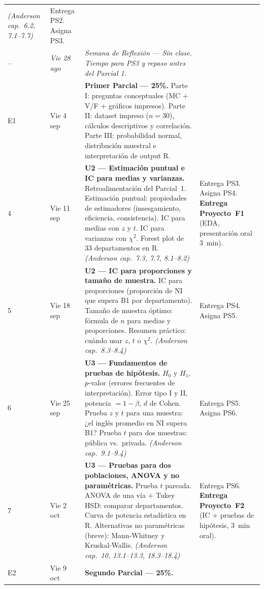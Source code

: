 \documentclass[11pt, a4paper]{article}
\begin{document}
{\begin{longtable}{C{0.7cm} L{2.1cm} L{6.4cm} L{5.2cm}}
  \textit{(Anderson cap.\ 6.2, 7.1--7.7)} &
  Entrega PS2. Asigna PS3. \\[3pt]
%
-- & \textit{Vie 28 ago} &
  \textit{Semana de Reflexi\'on --- Sin clase.}
  \textit{Tiempo para PS3 y repaso antes del Parcial 1.} & \\[3pt]
%
E1 & Vie 4 sep &
  \textbf{Primer Parcial --- 25\%.}
  Parte I: preguntas conceptuales (MC + V/F + gr\'aficos impresos).
  Parte II: dataset impreso ($n = 30$), c\'alculos descriptivos y correlaci\'on.
  Parte III: probabilidad normal, distribuci\'on muestral e interpretaci\'on de output R. & \\[3pt]
%
%
4  & Vie 11 sep &
  \textbf{U2 --- Estimaci\'on puntual e IC para medias y varianzas.}
  Retroalimentaci\'on del Parcial~1.
  Estimaci\'on puntual: propiedades de estimadores
  (insesgamiento, eficiencia, consistencia).
  IC para medias con $z$ y $t$. IC para varianzas con $\chi^2$.
  Forest plot de 33 departamentos en R.
  \textit{(Anderson cap.\ 7.3, 7.7, 8.1--8.2)} &
  Entrega PS3. Asigna PS4.
  \textbf{Entrega Proyecto~F1} (EDA, presentaci\'on oral 3~min). \\[3pt]
%
5  & Vie 18 sep &
  \textbf{U2 --- IC para proporciones y tama\~no de muestra.}
  IC para proporciones (proporci\'on de NI que supera B1 por departamento).
  Tama\~no de muestra \'optimo: f\'ormula de $n$ para medias y proporciones.
  Resumen pr\'actico: cu\'ando usar $z$, $t$ o $\chi^2$.
  \textit{(Anderson cap.\ 8.3--8.4)} &
  Entrega PS4. Asigna PS5. \\[3pt]
%
6  & Vie 25 sep &
  \textbf{U3 --- Fundamentos de pruebas de hip\'otesis.}
  $H_0$ y $H_1$, $p$-valor (errores frecuentes de interpretaci\'on).
  Error tipo I y II, potencia $= 1 - \beta$, $d$ de Cohen.
  Prueba $z$ y $t$ para una muestra: ¿el ingl\'es promedio en NI supera B1?
  Prueba $t$ para dos muestras: p\'ublica vs.\ privada.
  \textit{(Anderson cap.\ 9.1--9.4)} &
  Entrega PS5. Asigna PS6. \\[3pt]
%
7  & Vie 2 oct &
  \textbf{U3 --- Pruebas para dos poblaciones, ANOVA y no param\'etricas.}
  Prueba $t$ pareada.
  ANOVA de una v\'ia + Tukey HSD: comparar departamentos.
  Curva de potencia estad\'istica en R.
  Alternativas no param\'etricas (breve): Mann-Whitney y Kruskal-Wallis.
  \textit{(Anderson cap.\ 10, 13.1--13.3, 18.3--18.4)} &
  Entrega PS6.
  \textbf{Entrega Proyecto~F2} (IC + pruebas de hip\'otesis, 3~min oral). \\[3pt]
%
E2 & Vie 9 oct &
  \textbf{Segundo Parcial --- 25\%.}

\end{longtable}}
\end{document}
